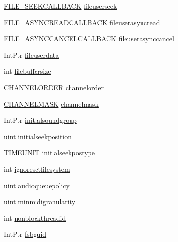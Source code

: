 \begin{DoxyCompactItemize}
\item 
\hyperlink{namespace_f_m_o_d_a5fb329aae3aea0658fa46c593359ead3}{F\+I\+L\+E\+\_\+\+S\+E\+E\+K\+C\+A\+L\+L\+B\+A\+CK} \hyperlink{struct_f_m_o_d_1_1_c_r_e_a_t_e_s_o_u_n_d_e_x_i_n_f_o_ab604df63f4838bac5c4b9ce3a9d4ad03}{fileuserseek}
\item 
\hyperlink{namespace_f_m_o_d_a12de5190001a0edf457fa49c0a2bde10}{F\+I\+L\+E\+\_\+\+A\+S\+Y\+N\+C\+R\+E\+A\+D\+C\+A\+L\+L\+B\+A\+CK} \hyperlink{struct_f_m_o_d_1_1_c_r_e_a_t_e_s_o_u_n_d_e_x_i_n_f_o_a81e260cf4c0ba76c37cbdae7b6caa454}{fileuserasyncread}
\item 
\hyperlink{namespace_f_m_o_d_a3122c90ec3ea0bfc0ec3b7372267b5f1}{F\+I\+L\+E\+\_\+\+A\+S\+Y\+N\+C\+C\+A\+N\+C\+E\+L\+C\+A\+L\+L\+B\+A\+CK} \hyperlink{struct_f_m_o_d_1_1_c_r_e_a_t_e_s_o_u_n_d_e_x_i_n_f_o_aa8ddd8e3b33161cb946856f9bf300d4b}{fileuserasynccancel}
\item 
Int\+Ptr \hyperlink{struct_f_m_o_d_1_1_c_r_e_a_t_e_s_o_u_n_d_e_x_i_n_f_o_a2912bdf09e52e87ce47a5ba91d55fc40}{fileuserdata}
\item 
int \hyperlink{struct_f_m_o_d_1_1_c_r_e_a_t_e_s_o_u_n_d_e_x_i_n_f_o_a2aacb77750ed528f6b6ffaf9bbc31c38}{filebuffersize}
\item 
\hyperlink{namespace_f_m_o_d_abedeb99eb6485be64623516ff974fa6f}{C\+H\+A\+N\+N\+E\+L\+O\+R\+D\+ER} \hyperlink{struct_f_m_o_d_1_1_c_r_e_a_t_e_s_o_u_n_d_e_x_i_n_f_o_a358b213a5929e7cfaf269bb00c1e52b7}{channelorder}
\item 
\hyperlink{namespace_f_m_o_d_ae295945ff00acb5f2e5ef0b3f217f5e2}{C\+H\+A\+N\+N\+E\+L\+M\+A\+SK} \hyperlink{struct_f_m_o_d_1_1_c_r_e_a_t_e_s_o_u_n_d_e_x_i_n_f_o_abbe89bf4c3d3e8026165df5d00429ca4}{channelmask}
\item 
Int\+Ptr \hyperlink{struct_f_m_o_d_1_1_c_r_e_a_t_e_s_o_u_n_d_e_x_i_n_f_o_a64207008b9fce0062af8f766050e5470}{initialsoundgroup}
\item 
uint \hyperlink{struct_f_m_o_d_1_1_c_r_e_a_t_e_s_o_u_n_d_e_x_i_n_f_o_a7b6014d4a910ecd57245801d90412e59}{initialseekposition}
\item 
\hyperlink{namespace_f_m_o_d_aff20975332f93ff2180d2681cb43929f}{T\+I\+M\+E\+U\+N\+IT} \hyperlink{struct_f_m_o_d_1_1_c_r_e_a_t_e_s_o_u_n_d_e_x_i_n_f_o_a27f001d356a5ea6da6a21d943a378557}{initialseekpostype}
\item 
int \hyperlink{struct_f_m_o_d_1_1_c_r_e_a_t_e_s_o_u_n_d_e_x_i_n_f_o_a2fb8b8798d61268af066674e37dc3608}{ignoresetfilesystem}
\item 
uint \hyperlink{struct_f_m_o_d_1_1_c_r_e_a_t_e_s_o_u_n_d_e_x_i_n_f_o_a8a4446c8826cde208648e2cbc49137fe}{audioqueuepolicy}
\item 
uint \hyperlink{struct_f_m_o_d_1_1_c_r_e_a_t_e_s_o_u_n_d_e_x_i_n_f_o_aa9804bbb4953b40dbe7fb17fa7237da1}{minmidigranularity}
\item 
int \hyperlink{struct_f_m_o_d_1_1_c_r_e_a_t_e_s_o_u_n_d_e_x_i_n_f_o_abaae5a027776f879775b89fc9824c7ac}{nonblockthreadid}
\item 
Int\+Ptr \hyperlink{struct_f_m_o_d_1_1_c_r_e_a_t_e_s_o_u_n_d_e_x_i_n_f_o_ae005a9e14ba9ebd9798a7cde83257eca}{fsbguid}
\end{DoxyCompactItemize}


